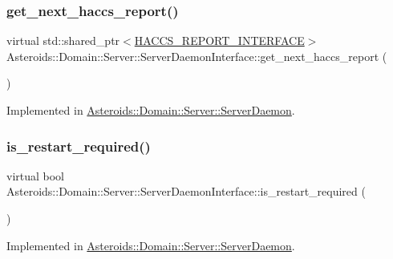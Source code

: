 \subsubsection{\texorpdfstring{get\+\_\+next\+\_\+haccs\+\_\+report()}{get\_next\_haccs\_report()}}
{\footnotesize\ttfamily virtual std\+::shared\+\_\+ptr$<$\hyperlink{classAsteroids_1_1Domain_1_1Server_1_1HACCS__REPORT__INTERFACE}{H\+A\+C\+C\+S\+\_\+\+R\+E\+P\+O\+R\+T\+\_\+\+I\+N\+T\+E\+R\+F\+A\+CE}$>$ Asteroids\+::\+Domain\+::\+Server\+::\+Server\+Daemon\+Interface\+::get\+\_\+next\+\_\+haccs\+\_\+report (\begin{DoxyParamCaption}{ }\end{DoxyParamCaption})\hspace{0.3cm}{\ttfamily [pure virtual]}}



Implemented in \hyperlink{classAsteroids_1_1Domain_1_1Server_1_1ServerDaemon_a53548491d0700fffff3730f3c48525d6}{Asteroids\+::\+Domain\+::\+Server\+::\+Server\+Daemon}.

\mbox{\label{classAsteroids_1_1Domain_1_1Server_1_1ServerDaemonInterface_a6296fbd5a6d327794f7692adf5290d9e}} 
\subsubsection{\texorpdfstring{is\+\_\+restart\+\_\+required()}{is\_restart\_required()}}
{\footnotesize\ttfamily virtual bool Asteroids\+::\+Domain\+::\+Server\+::\+Server\+Daemon\+Interface\+::is\+\_\+restart\+\_\+required (\begin{DoxyParamCaption}{ }\end{DoxyParamCaption})\hspace{0.3cm}{\ttfamily [pure virtual]}}



Implemented in \hyperlink{classAsteroids_1_1Domain_1_1Server_1_1ServerDaemon_a3cafc61bfa34d7af93f6d50a36380da0}{Asteroids\+::\+Domain\+::\+Server\+::\+Server\+Daemon}.

\mbox{\label{classAsteroids_1_1Domain_1_1Server_1_1ServerDaemonInterface_a84b60c3467a1545cb24ec9556ccf707e}} 
